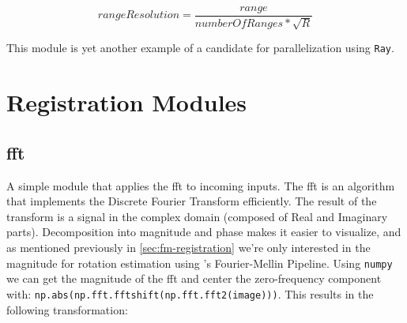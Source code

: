 \[rangeResolution = \frac{range}{numberOfRanges * \sqrt{R}}\]

This module is yet another example of a candidate for parallelization using \texttt{Ray}.

\section{Registration Modules}



\subsection{\acrfull{fft}}

A simple module that applies the \acrshort{fft} to incoming inputs. The \acrshort{fft} is an algorithm that implements the Discrete Fourier Transform efficiently. The result of the transform is a signal in the complex domain (composed of Real and Imaginary parts). Decomposition into magnitude and phase makes it easier to visualize, and as mentioned previously in \autoref{sec:fm-registration} we're only interested in the magnitude for rotation estimation using \citeauthor{Reddy1996}'s Fourier-Mellin Pipeline. Using \texttt{numpy} we can get the magnitude of the \acrshort{fft} and center the zero-frequency component with: \lstinline{np.abs(np.fft.fftshift(np.fft.fft2(image)))}. This results in the following transformation:

